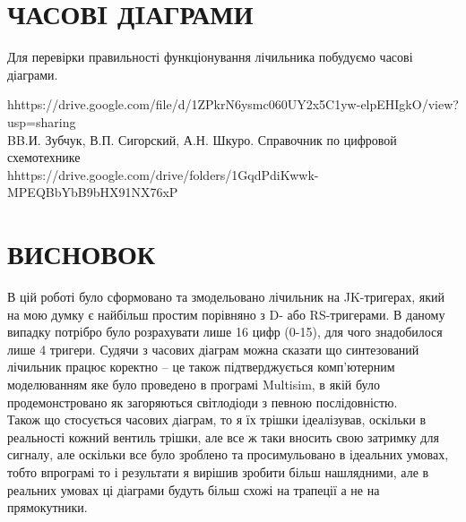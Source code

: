 \documentclass[a4paper,14pt]{extreport}
\begin{document}
\begin{figure}[h!]
\end{figure}


\chapter{  ЧАСОВI ДIАГРАМИ  }
Для перевірки правильності функціонування лічильника побудуємо часові діаграми.


\begin{figure}[h!]
\end{figure}

\begin{figure}[h!]
\end{figure}







\begin{thebibliography}{2}
\bibitem  hhttps://drive.google.com/file/d/1ZPkrN6ysmc060UY2x5C1yw-elpEHIgkO/view?usp=sharing\\
\bibitem  BB.И. Зубчук, В.П. Сигорский, А.Н. Шкуро. Справочник по цифровой схемотехнике \\
\bibitem   hhttps://drive.google.com/drive/folders/1GqdPdiKwwk-MPEQBbYbB9bHX91NX76xP
\end{thebibliography}


\chapter{   ВИСНОВОК }
В цій роботі було сформовано та змодельовано лічильник на JK-тригерах, який на мою думку є найбільш простим порівняно з D- або RS-тригерами. В даному випадку потрібро було розрахувати лише 16 цифр (0-15), для чого знадобилося лише 4 тригери. Судячи  з часових діаграм можна сказати що синтезований лічильник працює коректно -- це також підтверджується комп'ютерним моделюванням яке було проведено в програмі Multisim, в якій було  продемонстровано як загоряються світлодіоди з певною послідовністю. \\ 

Також що стосується часових діаграм, то я їх трішки ідеалізував, оскільки в реальності кожний вентиль трішки, але все ж таки вносить свою затримку для сигналу, але оскільки все було зроблено та просимульовано в ідеальних умовах, тобто впрограмі то і результати я вирішив зробити більш нашлядними, але в реальних умовах ці діаграми будуть більш схожі на трапеції а не на прямокутники. 
\end{document}

